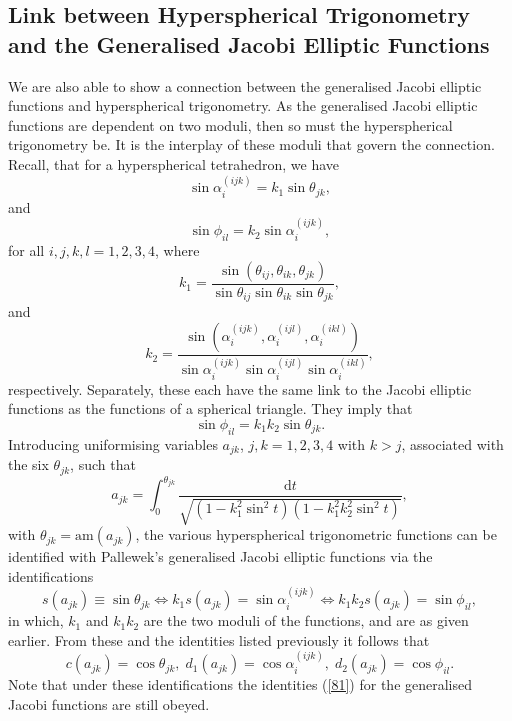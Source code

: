 \documentclass[fleqn,11pt,twoside]{article}
\theoremstyle{definition}
\begin{document}
\subsection{Link between Hyperspherical Trigonometry and the Generalised Jacobi Elliptic Functions}

We are also able to show a connection between the generalised Jacobi elliptic functions and hyperspherical trigonometry. As the generalised Jacobi elliptic functions are dependent on two moduli, then so must the hyperspherical trigonometry be. It is the interplay of these moduli that govern the connection. Recall, that for a hyperspherical tetrahedron, we have
\begin{equation}
\sin\alpha_i^{(ijk)}=k_1\sin\theta_{jk},
\end{equation}
and
\begin{equation}
\sin\phi_{il}=k_2\sin\alpha_i^{(ijk)},
\end{equation}
for all $i,j,k,l=1,2,3,4$, where
\begin{equation}
k_1=\frac{\sin(\theta_{ij},\theta_{ik},\theta_{jk})}{\sin\theta_{ij}\sin\theta_{ik}\sin\theta_{jk}},
\end{equation}
and
\begin{equation}
k_2=\frac{\sin(\alpha_i^{(ijk)},\alpha_i^{(ijl)},\alpha_i^{(ikl)})}{\sin\alpha_i^{(ijk)}\sin\alpha_i^{(ijl)}\sin\alpha_i^{(ikl)}},
\end{equation}
respectively. Separately, these each have the same link to the Jacobi elliptic functions as the functions of a spherical triangle. They imply that
\begin{equation}
\sin\phi_{il}=k_1k_2\sin\theta_{jk}.
\end{equation}
Introducing uniformising variables $a_{jk}$, $j,k=1,2,3,4$ with $k>j$, associated with the six $\theta_{jk}$, such that
\begin{equation}
a_{jk}=\int_{0}^{\theta_{jk}}\frac{\mathrm{d}t}{\sqrt{(1-k_1^2\sin^2t)(1-k_1^2k_2^2\sin^2t)}},
\end{equation}
with $\theta_{jk}=\mathrm{am}(a_{jk})$, the various hyperspherical trigonometric functions can be identified with Pallewek's generalised Jacobi elliptic functions via the identifications
\begin{equation}
s(a_{jk})\equiv\sin\theta_{jk}\iff k_1s(a_{jk})=\sin\alpha_i^{(ijk)}\iff k_1k_2s(a_{jk})=\sin\phi_{il},
\end{equation}
in which, $k_1$ and $k_1k_2$ are the two moduli of the functions, and are as given earlier. From these and the identities listed previously it follows that
\begin{equation}
c(a_{jk})=\cos\theta_{jk},\; d_1(a_{jk})=\cos\alpha_i^{(ijk)},\; d_2(a_{jk})=\cos\phi_{il}.
\end{equation}
Note that under these identifications the identities (\ref{81}) for the generalised Jacobi functions are still obeyed.
\end{document}
